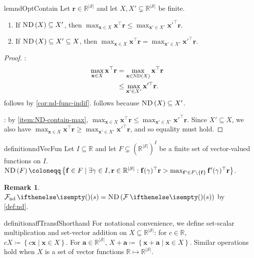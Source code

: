 \documentclass{article}
\renewcommand{\abs}[1]{\left|#1\right|}
\newcommand*{\prn}[1]{\left(#1\right)}
\renewcommand{\set}[1]{\left\{#1\right\}}
\newcommand*{\defeq}{\coloneqq} %
\newcommand*{\x}{\mathbf{x}} %
\newcommand*{\av}{\mathbf{a}}
\newcommand*{\reals}{\mathbb{R}}
\newcommand*{\upsc}[1]{\text{\upshape\textsc{#1}}}
\newcommand*{\St}{\mathcal{S}}
\newcommand*{\rf}{\mathbf{r}} %
\newcommand*{\rewardVS}{\reals^{\abs{\St}}} %
\newcommand*{\f}{\mathbf{f}} %
\newcommand*{\ND}[1]{\upsc{ND}\prn{#1}}
\theoremstyle{definition}
\newtheorem*{remark}{Remark}
\begin{document}
\begin{appendices}
\begin{restatable}{lem}{ndOptContain}\label{lem:nd-opt-contain}
Let $\rf \in \rewardVS$ and let $X,X'\subsetneq \rewardVS$ be finite. 
\begin{enumerate}
    \item If $\ND{X}\subseteq X'$, then $\max_{\x\in X} \x^\top \rf\leq\max_{\x'\in X'} \x'^\top \rf$.\label{item:ND-contain-max}
    \item If $\ND{X}\subseteq X'\subseteq X$, then $\max_{\x\in X} \x^\top \rf=\max_{\x'\in X'} \x'^\top \rf$.\label{item:ND-contain-max-2}
\end{enumerate}
\end{restatable}
\begin{proof}
: 
\begin{align}
\max_{\x\in X} \x^\top \rf&=\max_{\x\in \ND{X}} \x^\top \rf\label{eq:item-max}\\
&\leq \max_{\x'\in X'} \x'^\top \rf.\label{eq:item-max-2}
\end{align}
 follows by \cref{cor:nd-func-indif}.  follows because $\ND{X}\subseteq X'$.

: by \cref{item:ND-contain-max}, $\max_{\x\in X} \x^\top \rf\leq\max_{\x'\in X'} \x'^\top \rf$. Since $X'\subseteq X$, we also have $\max_{\x\in X} \x^\top \rf\geq\max_{\x'\in X'} \x'^\top \rf$, and so equality must hold.
\end{proof}

\begin{restatable}{definition}{ndVecFun}\label{def:nd-vec-func} 
Let $I\subseteq \reals$ and let $F\subsetneq \prn{\rewardVS}^I$ be a finite set of vector-valued functions on $I$. $\ND{F}\defeq \set{\f\in F\mid \exists \gamma\in I, \rf \in \rewardVS: \f(\gamma)^\top \rf> \max_{\f'\in F\setminus \set{\f}}\f'(\gamma)^\top \rf}$.
\end{restatable}

\begin{remark}
$\Fnd(s)=\ND{\F(s)}$ by \cref{def:nd}.
\end{remark}

\begin{restatable}{definition}{affTransfShorthand}\label{def:aff-transf-short}
For notational convenience, we define set-scalar multiplication and set-vector addition on $X\subseteq \rewardVS$: for $c\in\reals$, $cX\defeq \set{c\x\mid\x\in X}$. For $\av \in \rewardVS$, $X+\av\defeq \set{\x+\av\mid \x \in X}$. Similar operations hold when $X$ is a set of vector functions $\reals\mapsto \rewardVS$.
\end{restatable}


\end{appendices}
\end{document}
